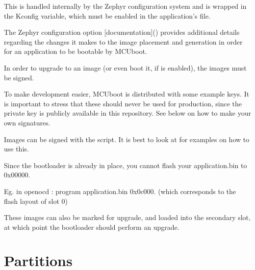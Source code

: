 \documentclass[letterpaper,10pt,english]{sphinxmanual}
\begin{document}
This is handled internally by the Zephyr configuration system and is wrapped
in the  Kconfig variable, which must be enabled in
the application’s  file.

The Zephyr  configuration option
{[}documentation{]}()
provides additional details regarding the changes it makes to the image
placement and generation in order for an application to be bootable by
MCUboot.

In order to upgrade to an image (or even boot it, if
 is enabled), the images must be signed.

To make development easier, MCUboot is distributed with some example
keys.  It is important to stress that these should never be used for
production, since the private key is publicly available in this
repository.  See below on how to make your own signatures.

Images can be signed with the  script.  It is best
to look at  for examples on how to use this.

Since the bootloader is already in place, you cannot flash your application.bin to 0x00000.

Eg. in openocd : program application.bin 0x0c000. (which corresponds to the flash layout of slot 0)

These images can also be marked for upgrade, and loaded into the secondary slot,
at which point the bootloader should perform an upgrade.


\section{Partitions}
\label{\detokenize{fota/partitions:partitions}}\label{\detokenize{fota/partitions:signing}}\label{\detokenize{fota/partitions::doc}}
\begin{sphinxVerbatim}[commandchars=\\\{\}]
\end{sphinxVerbatim}
\end{document}

